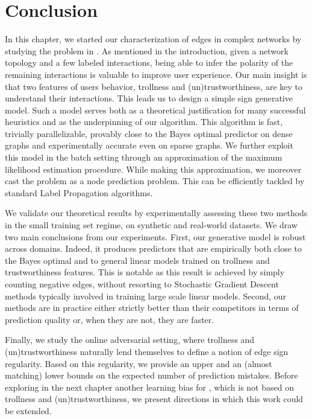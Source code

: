 \section{Conclusion}

In this chapter, we started our characterization of edges in complex networks by studying the \esp{}
problem in \dssn{}. As mentioned in the introduction, given a network topology and a few labeled
interactions, being able to infer the polarity of the remaining interactions is valuable to improve
user experience. Our main insight is that two features of users behavior, trollness and
(un)trustworthiness, are key to understand their interactions. This leads us to design a simple sign
generative model. Such a model serves both as a theoretical justification for many successful
heuristics and as the underpinning of our \usrule{} algorithm. This algorithm is fast, trivially
parallelizable, provably close to the Bayes optimal predictor on dense graphs and experimentally
accurate even on sparse graphs. We further exploit this model in the batch setting through an
approximation of the maximum likelihood estimation procedure. While making this approximation, we
moreover cast the problem as a node prediction problem. This can be efficiently tackled by standard
Label Propagation algorithms.

We validate our theoretical results by experimentally assessing these two methods in the small
training set regime, on synthetic and real-world datasets. We draw two main conclusions from our
experiments. First, our generative model is robust across domains. Indeed, it produces predictors
that are empirically both close to the Bayes optimal and to general linear models trained on
trollness and trustworthiness features. This is notable as this result is achieved by simply
counting negative edges, without resorting to Stochastic Gradient Descent methods typically involved
in training large scale linear models. Second, our methods are in practice either strictly better
than their competitors in terms of prediction quality or, when they are not, they are faster.

Finally, we study the online adversarial setting, where trollness and (un)trustworthiness naturally
lend themselves to define a notion of edge sign regularity. Based on this regularity, we provide an
upper and an (almost matching) lower bounds on the expected number of prediction mistakes. Before
exploring in the next chapter another learning bias for \esp{}, which is not based on trollness and
(un)trustworthiness, we present directions in which this work could be extended.


